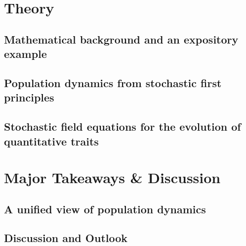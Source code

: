 \documentclass[twoside,12pt]{iiser-thesis-modified} %
\begin{document}
\part{Theory}\label{part_theory}
\endgroup

\chapter{Mathematical background and an expository example}\label{chap_math_background}


\chapter{Population dynamics from stochastic first principles}\label{chap_BD}


\chapter{Stochastic field equations for the evolution of quantitative traits}\label{chap_infD_processes}


\cleardoublepage
\begingroup
\makeatletter
\let\ps@plain\ps@empty
\part{Major Takeaways \& Discussion}\label{part_summary}
\endgroup

\chapter{A unified view of population dynamics}\label{chap_unification}


\chapter{Discussion and Outlook}\label{sec_disc}


\clearpage
\null\thispagestyle{plain}\newpage
\ifodd\value{page}\else\null\thispagestyle{plain}\newpage\fi
\end{document}
